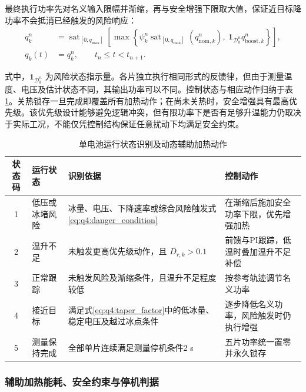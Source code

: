 \documentclass[bwprint]{gmcmthesis}
\numberwithin{equation}{section}
\numberwithin{figure}{section}
\begin{document}
最终执行功率先对名义输入限幅并渐缩，再与安全增强下限取大值，保证近目标降功率不会抵消已经触发的风险响应：
\begin{equation}
\begin{aligned}
q_k^n&=\operatorname{sat}_{[0,q_{\max}]}\!\left[
\max\!\left\{\psi_k^n\operatorname{sat}_{[0,q_{\max}]}(q_{\mathrm{nom},k}^n),
\ \boldsymbol 1_{\mathcal D_k^n}q_{\mathrm{boost},k}^n\right\}\right],
\\
q_k(t)&=q_k^n,\qquad t_n\leq t<t_{n+1}.
\end{aligned}
\label{eq:q4:applied_power}
\end{equation}

式中，$\boldsymbol 1_{\mathcal D_k^n}$ 为风险状态指示量。各片独立执行相同形式的反馈律，但由于测量温度、电压及估计状态不同，其输出功率可以不同。控制状态与相应动作归纳于表\ref{tab:q4:states}。关热锁存一旦完成即覆盖所有加热动作；在尚未关热时，安全增强具有最高优先级。该优先级设计能够避免逻辑冲突，但有限功率下是否有足够升温能力仍取决于实际工况，不能仅凭控制结构保证任意扰动下均满足安全约束。

\begin{table}[htbp]
    \centering
    \caption{单电池运行状态识别及动态辅助加热动作}
    \vspace{0.3cm}
    \label{tab:q4:states}
    \renewcommand{\arraystretch}{1.4}
    \small
    \setlength{\tabcolsep}{4pt}
    \begin{tabular}{c p{2.7cm} p{6.0cm} p{4.8cm}}
        \toprule
        \textbf{状态码} & \textbf{运行状态} & \textbf{识别依据} & \textbf{控制动作} \\
        \midrule
        1 & 低压或冰堵风险 & 冰量、电压、下降速率或综合风险触发式\eqref{eq:q4:danger_condition} & 在渐缩后施加安全功率下限，优先增强加热 \\
        2 & 温升不足 & 未触发更高优先级动作，且 $D_{r,k}>0.1$ & 前馈与PI跟踪，低温时叠加温升不足补偿 \\
        3 & 正常跟踪 & 未触发风险及渐缩条件，且温升不足程度较低 & 按参考轨迹调节名义功率 \\
        4 & 接近目标 & 满足式\eqref{eq:q4:taper_factor}中的低冰量、稳定电压及越过冰点条件 & 逐步降低名义功率，风险触发时仍执行增强 \\
        5 & 测量保持完成 & 全部单片连续满足测量停机条件2 s & 五片功率统一置零并永久锁存 \\
        \bottomrule
    \end{tabular}
\end{table}

\subsubsection{辅助加热能耗、安全约束与停机判据}
\end{document}
